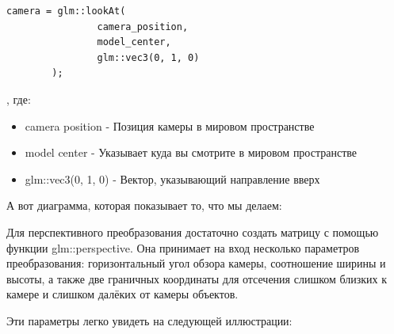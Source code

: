 \documentclass[14pt,a4paper,report]{report}
\begin{document}
\begin{lstlisting}
camera = glm::lookAt(
                camera_position,
                model_center,
                glm::vec3(0, 1, 0)
        );
\end{lstlisting}
, где:
\begin{itemize}
\item camera position - Позиция камеры в мировом пространстве

\item model center - Указывает куда вы смотрите в мировом пространстве

\item glm::vec3(0, 1, 0) - Вектор, указывающий направление вверх

\end{itemize}

А вот диаграмма, которая показывает то, что мы делаем:
\begin{figure}[h!]
\label{ris:image}
\end{figure}

Для перспективного преобразования достаточно создать матрицу с помощью функции glm::perspective. Она принимает на вход несколько  параметров преобразования: горизонтальный угол обзора камеры, соотношение ширины и высоты, а также две граничных координаты для отсечения слишком близких к камере и слишком далёких от камеры объектов. 

Эти параметры легко увидеть на следующей иллюстрации:

\begin{figure}[h!]
\label{ris:image}
\end{figure}
\end{document}
